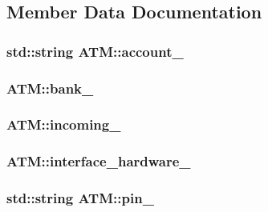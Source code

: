 \subsection{Member Data Documentation}
\hypertarget{classATM_a25cd6fda12c3a95144d820de539adee6}{
\subsubsection[{account\-\_\-}]{\setlength{\rightskip}{0pt plus 5cm}std\-::string A\-T\-M\-::account\-\_\-\hspace{0.3cm}{\ttfamily [private]}}}\label{classATM_a25cd6fda12c3a95144d820de539adee6}
\hypertarget{classATM_ad4f43517a9785b318afb336355672efe}{
\subsubsection[{bank\-\_\-}]{ A\-T\-M\-::bank\-\_\-\hspace{0.3cm}{\ttfamily [private]}}}\label{classATM_ad4f43517a9785b318afb336355672efe}
\hypertarget{classATM_a59b7d4c15875982aef0399de08d1c6c0}{
\subsubsection[{incoming\-\_\-}]{ A\-T\-M\-::incoming\-\_\-\hspace{0.3cm}{\ttfamily [private]}}}\label{classATM_a59b7d4c15875982aef0399de08d1c6c0}
\hypertarget{classATM_aeffb0e1f17d32a7dcf2f84643390e614}{
\subsubsection[{interface\-\_\-hardware\-\_\-}]{ A\-T\-M\-::interface\-\_\-hardware\-\_\-\hspace{0.3cm}{\ttfamily [private]}}}\label{classATM_aeffb0e1f17d32a7dcf2f84643390e614}
\hypertarget{classATM_abf1480605c201cac7d94e0057c372517}{
\subsubsection[{pin\-\_\-}]{\setlength{\rightskip}{0pt plus 5cm}std\-::string A\-T\-M\-::pin\-\_\-\hspace{0.3cm}{\ttfamily [private]}}}\label{classATM_abf1480605c201cac7d94e0057c372517}
